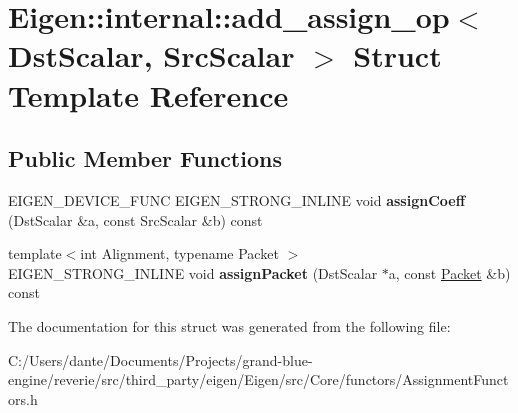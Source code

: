 \hypertarget{struct_eigen_1_1internal_1_1add__assign__op}{}\section{Eigen\+::internal\+::add\+\_\+assign\+\_\+op$<$ Dst\+Scalar, Src\+Scalar $>$ Struct Template Reference}
\label{struct_eigen_1_1internal_1_1add__assign__op}
\subsection*{Public Member Functions}
\begin{DoxyCompactItemize}
\item 
\mbox{\label{struct_eigen_1_1internal_1_1add__assign__op_a94b49e5951ce3c543def36b10c7700ac}} 
E\+I\+G\+E\+N\+\_\+\+D\+E\+V\+I\+C\+E\+\_\+\+F\+U\+NC E\+I\+G\+E\+N\+\_\+\+S\+T\+R\+O\+N\+G\+\_\+\+I\+N\+L\+I\+NE void {\bfseries assign\+Coeff} (Dst\+Scalar \&a, const Src\+Scalar \&b) const
\item 
\mbox{\label{struct_eigen_1_1internal_1_1add__assign__op_a2f340fd488f744d8487083b4d51fd350}} 
{\footnotesize template$<$int Alignment, typename Packet $>$ }\\E\+I\+G\+E\+N\+\_\+\+S\+T\+R\+O\+N\+G\+\_\+\+I\+N\+L\+I\+NE void {\bfseries assign\+Packet} (Dst\+Scalar $\ast$a, const \mbox{\hyperlink{union_eigen_1_1internal_1_1_packet}{Packet}} \&b) const
\end{DoxyCompactItemize}


The documentation for this struct was generated from the following file\+:\begin{DoxyCompactItemize}
\item 
C\+:/\+Users/dante/\+Documents/\+Projects/grand-\/blue-\/engine/reverie/src/third\+\_\+party/eigen/\+Eigen/src/\+Core/functors/Assignment\+Functors.\+h\end{DoxyCompactItemize}
